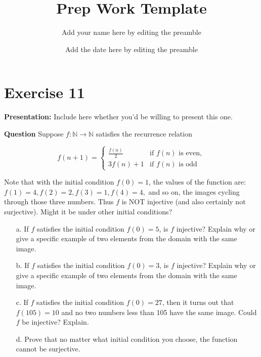 \documentclass{article}
\title{Prep Work Template}
\author{Add your name here by editing the preamble}
\date{Add the date here by editing the preamble}
\begin{document}
\maketitle



\section*{Exercise 11}  

\noindent\textbf{Presentation:} Include here whether you'd be willing to present this one. 

\vspace{0.5cm} %

\noindent\textbf{Question}
Suppose \( f : \mathbb{N} \rightarrow \mathbb{N} \) satisfies the recurrence relation

\[
f(n + 1) = \begin{cases} 
\frac{f(n)}{2} & \text{if } f(n) \text{ is even}, \\
3f(n) + 1 & \text{if } f(n) \text{ is odd}
\end{cases}
\]

Note that with the initial condition \( f(0) = 1 \), the values of the function are:
\( f(1) = 4, f(2) = 2, f(3) = 1, f(4) = 4, \) and so on, the images cycling through
those three numbers. Thus \( f \) is NOT injective (and also certainly not surjective).
Might it be under other initial conditions?

\begin{enumerate}
    \item[a.] If \( f \) satisfies the initial condition \( f(0) = 5 \), is \( f \) injective? Explain why or give a specific example of two elements from the domain with the same image.

    \item[b.] If \( f \) satisfies the initial condition \( f(0) = 3 \), is \( f \) injective? Explain why or give a specific example of two elements from the domain with the same image.

    \item[c.] If \( f \) satisfies the initial condition \( f(0) = 27 \), then it turns out that \( f(105) = 10 \) and no two numbers less than 105 have the same image. Could \( f \) be injective? Explain.

    \item[d.] Prove that no matter what initial condition you choose, the function cannot be surjective.
\end{enumerate}
\end{document}
